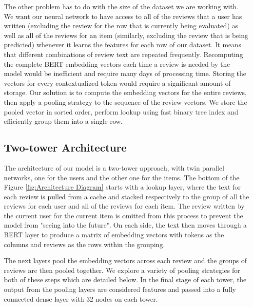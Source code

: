 \documentclass[11pt,a4paper]{article}
\begin{document}
The other problem has to do with the size of the dataset we are working with.  We want our neural network to have access to all of the reviews that a user has written (excluding the review for the row that is currently being evaluated) as well as all of the reviews for an item (similarly, excluding the review that is being predicted) whenever it learns the features for each row of our dataset.  It means that different combinations of review text are repeated frequently.  Recomputing the complete BERT embedding vectors each time a review is needed by the model would be inefficient and require many days of processing time.  Storing the vectors for every contextualized token would require a significant amount of storage.  Our solution is to compute the embedding vectors for the entire reviews, then apply a pooling strategy to the sequence of the review vectors. We store the pooled vector in sorted order, perform lookup using fast binary tree index and efficiently group them into a single row.

\subsection{Two-tower Architecture}

The architecture of our model is a two-tower approach, with twin parallel networks, one for the users and the other one for the items.  The bottom of the  Figure \ref{fig:Architecture Diagram} starts with a lookup layer, where the text for each review is pulled from a cache and stacked respectively to the group of all the reviews for each user and all of the reviews for each item. The review written by the current user for the current item is omitted from this process to prevent the model from "seeing into the future".  On each side, the text then moves through a BERT layer to produce a matrix of embedding vectors with tokens as the columns and reviews as the rows within the grouping.

The next layers pool the embedding vectors across each review and the groups of reviews are then pooled together.  We explore a variety of pooling strategies for both of these steps which are detailed below.  In the final stage of each tower, the output from the pooling layers are considered features and passed into a fully connected dense layer with 32 nodes on each tower.
\end{document}
